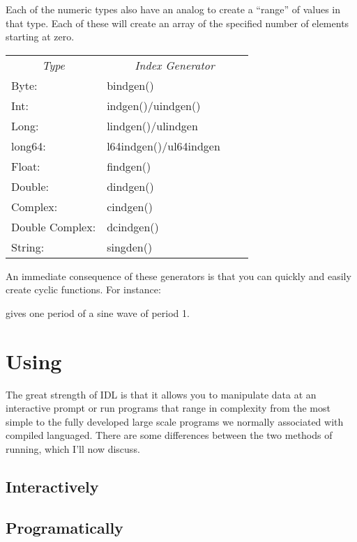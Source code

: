\documentclass{article}
\begin{document}
   Each of the numeric types also have an analog to create a ``range''
   of values in that type. Each of these will create an array of the
   specified number of elements starting at zero.

   \begin{center}
   \begin{tabular}{l|l|l|l}\hline
   \multicolumn{1}{|c|}{\sl Type} &
   \multicolumn{3}{|c|}{\sl Index Generator} \\
	Byte:    & bindgen() \\
        Int:     & indgen()/uindgen() \\
        Long:    & lindgen()/ulindgen \\
	long64:  & l64indgen()/ul64indgen \\
        Float:   & findgen() \\
	Double:  & dindgen() \\
	Complex: & cindgen() \\
	Double Complex: & dcindgen() \\
	String: & singden() \\ 
   \end{tabular}
   \end{center}

  An immediate consequence of these generators is that you can quickly
  and easily create cyclic functions. For instance:


  gives one period of a sine wave of period 1.

  
\section{Using}
  
  The great strength of IDL is that it allows you to manipulate data
  at an interactive prompt or run programs that range in complexity
  from the most simple to the fully developed large scale programs we
  normally associated with compiled languaged. There are some
  differences between the two methods of running, which I'll now
  discuss.


\subsection{Interactively}
\subsection{Programatically}
\end{document}
